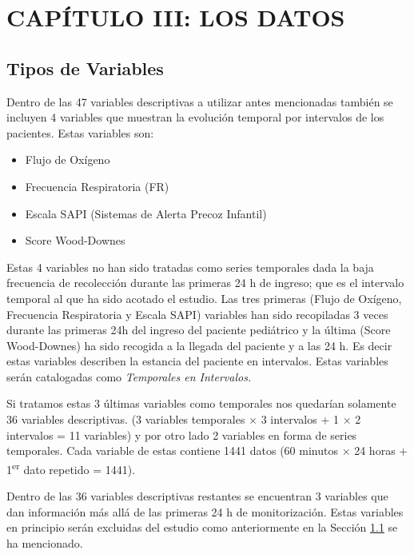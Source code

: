\section{CAPÍTULO III: LOS DATOS}\label{sec:los-datos}

\subsection{Tipos de Variables}\label{sec:tiposdevariables}

Dentro de las 47 variables descriptivas a utilizar antes mencionadas también se incluyen 4 variables que muestran la evolución temporal por intervalos de los pacientes. Estas variables son:

\begin{itemize}
    \item Flujo de Oxígeno
    \item Frecuencia Respiratoria (FR)
    \item Escala SAPI (Sistemas de Alerta Precoz Infantil)
    \item Score Wood-Downes
\end{itemize}

Estas 4 variables no han sido tratadas como series temporales dada la baja frecuencia de recolección durante las primeras 24 h de ingreso; que es el intervalo temporal al que ha sido acotado el estudio. Las tres primeras (Flujo de Oxígeno, Frecuencia Respiratoria y Escala SAPI) variables han sido recopiladas 3 veces durante las primeras 24h del ingreso del paciente pediátrico y la última (Score Wood-Downes) ha sido recogida a la llegada del paciente y a las 24 h. Es decir estas variables describen la estancia del paciente en intervalos.  Estas variables serán catalogadas como \textit{Temporales en Intervalos.} 

Si tratamos estas 3 últimas variables como temporales nos quedarían solamente 36 variables descriptivas. (3 variables temporales $\times$ 3 intervalos + 1 $\times$ 2 intervalos = 11 variables) y por otro lado 2 variables en forma de series temporales. Cada variable de estas contiene 1441 datos (60 minutos $\times$ 24 horas + 1\textsuperscript{er} dato repetido
= 1441).

Dentro de las 36 variables descriptivas restantes se encuentran 3 variables que dan información más allá de las primeras 24 h de monitorización. Estas variables en principio serán excluidas del estudio como anteriormente en la Sección \ref{sec:tiposdevariables} se ha mencionado. 

